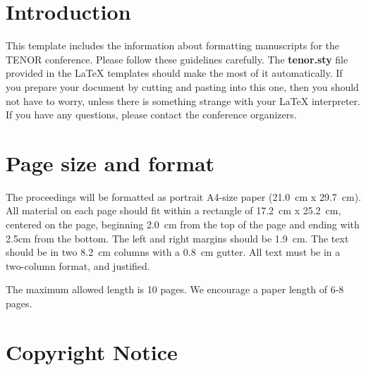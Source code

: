 \documentclass{article}
\title{\papertitle}
\begin{document}
%
\capstartfalse
\maketitle
\capstarttrue
%
\begin{abstract}
The abstract should placed at the top left column on the first page. 
Please write about 150-200 words that specifically highlight the purpose of your work, its context, and provide a brief synopsis of your results. 
Abstract should be one single paragraph and not contain equations, special characters or specific format instructions (bullet lists, URLs, etc.) 
Do not use citations or footnotes in the abstract. 
As all first paragraphs, the abstract should not be indented.
\end{abstract}
%

\section{Introduction}\label{sec:introduction}
This template includes the information about formatting manuscripts for the TENOR conference.
Please follow these guidelines carefully.
The \textbf{tenor.sty} file provided in the \LaTeX{} templates should make the most of it automatically.
If you prepare your document by cutting and pasting into this one, then you should not have to worry, 
unless there is something strange with your \LaTeX{} interpreter.
If you have any questions, please contact the conference organizers.

\section{Page size and format}\label{sec:page_size}
The proceedings will be formatted as portrait A4-size paper (21.0~cm x 29.7~cm).
All material on each page should fit within a rectangle of 17.2~cm x 25.2~cm, centered on the page, beginning 2.0~cm from the top of the page and ending with 2.5cm from the bottom.
The left and right margins should be 1.9~cm.
The text should be in two 8.2~cm columns with a 0.8~cm gutter.
All text must be in a two-column format, and justified.

The maximum allowed length is 10 pages. 
We encourage a paper length of 6-8 pages.

\section{Copyright Notice}\label{sec:copyright}
\end{document}
